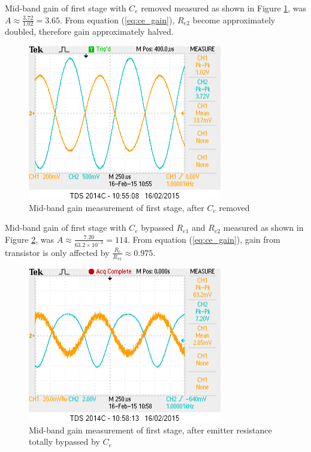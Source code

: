 \documentclass[a4paper,notitlepage,10pt]{report}
\begin{document}
\begin{multicols}{2}
Mid-band gain of first stage with $C_e$ removed measured as shown in Figure \ref{fig:lab_ce_gain_removed}, was $A \approx \frac{3.72}{1.02} = 3.65$. From equation (\ref{eq:ce_gain}), $R_{e2}$ become approximately doubled, therefore gain approximately halved.
\parskip=0pt

\begin{figure}[H]
	\centering
	\includegraphics[width=0.85\columnwidth]{labcegainremoved}
	\caption{Mid-band gain measurement of first stage, after $C_e$ removed}
	\label{fig:lab_ce_gain_removed}
\end{figure}
\parskip=6pt

Mid-band gain of first stage with $C_e$ bypassed $R_{e1}$ and $R_{e2}$ measured as shown in Figure \ref{fig:lab_ce_gain_bridged}, was $A \approx \frac{7.20}{63.2\times 10^{-3}} = 114$. From equation (\ref{eq:ce_gain}), gain from transistor is only affected by $\frac{R_c}{R_{\pi1}} \approx 0.975$.
\parskip=0pt

\begin{figure}[H]
	\centering
	\includegraphics[width=0.85\columnwidth]{labcegainbridged}
	\caption{Mid-band gain measurement of first stage, after emitter resistance totally bypassed by $C_e$}
	\label{fig:lab_ce_gain_bridged}
\end{figure}
\parskip=6pt


\end{multicols}
\end{document}
